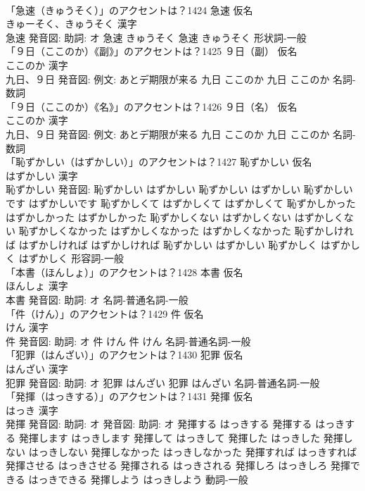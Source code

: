\documentclass[8pt]{extreport}
\begin{document}
\begin{CJK}{UTF8}{min}
\\	「急速（きゅうそく）」のアクセントは？1424	急速 仮名　
\\	きゅーそく、きゅうそく 漢字　
\\	急速 発音図: 助詞: オ	急速 きゅうそく		急速 きゅうそく				形状詞-一般 
\\	「９日（ここのか）《副》」のアクセントは？1425	９日（副） 仮名　
\\	ここのか 漢字　
\\	九日、９日 発音図: 例文: あとデ期限が来る	九日 ここのか		九日 ここのか				名詞-数詞 
\\	「９日（ここのか）《名》」のアクセントは？1426	９日（名） 仮名　
\\	ここのか 漢字　
\\	九日、９日 発音図: 例文: あとデ期限が来る	九日 ここのか		九日 ここのか				名詞-数詞 
\\	「恥ずかしい（はずかしい）」のアクセントは？1427	恥ずかしい 仮名　
\\	はずかしい 漢字　
\\	恥ずかしい 発音図:	恥ずかしい はずかしい		恥ずかしい はずかしい 恥ずかしいです はずかしいです 恥ずかしくて はずかしくて はずかしくて 恥ずかしかった はずかしかった はずかしかった 恥ずかしくない はずかしくない はずかしくない 恥ずかしくなかった はずかしくなかった はずかしくなかった 恥ずかしければ はずかしければ はずかしければ 恥ずかしい はずかしい 恥ずかしく はずかしく はずかしく				形容詞-一般 
\\	「本書（ほんしょ）」のアクセントは？1428	本書 仮名　
\\	ほんしょ 漢字　
\\	本書 発音図: 助詞: オ							名詞-普通名詞-一般 
\\	「件（けん）」のアクセントは？1429	件 仮名　
\\	けん 漢字　
\\	件 発音図: 助詞: オ	件 けん		件 けん				名詞-普通名詞-一般 
\\	「犯罪（はんざい）」のアクセントは？1430	犯罪 仮名　
\\	はんざい 漢字　
\\	犯罪 発音図: 助詞: オ	犯罪 はんざい		犯罪 はんざい				名詞-普通名詞-一般 
\\	「発揮（はっきする）」のアクセントは？1431	発揮 仮名　
\\	はっき 漢字　
\\	発揮 発音図: 助詞: オ 発音図: 助詞: オ	発揮する はっきする		発揮する はっきする 発揮します はっきします 発揮して はっきして 発揮した はっきした 発揮しない はっきしない 発揮しなかった はっきしなかった 発揮すれば はっきすれば 発揮させる はっきさせる 発揮される はっきされる 発揮しろ はっきしろ 発揮できる はっきできる 発揮しよう はっきしよう				動詞-一般 

\end{CJK}
\end{document}
